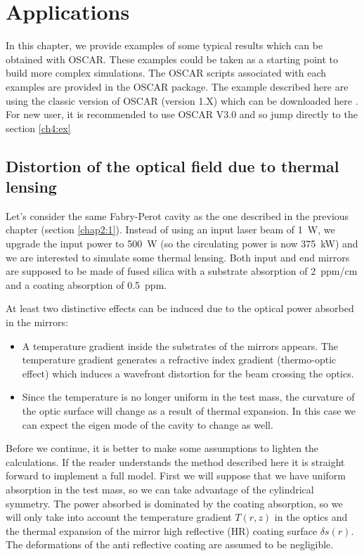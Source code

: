 \chapter{Applications}

In this chapter, we provide examples of some typical results which can be obtained with OSCAR. These examples could be taken as a starting point to build more complex simulations. The OSCAR scripts associated with each examples are provided in the OSCAR package. The example described here are using the classic version of OSCAR (version 1.X) which can be downloaded here \cite{OS_down}. For new user, it is recommended to use OSCAR V3.0 and so jump directly to the section \ref{ch4:ex}

\section{Distortion of the optical field due to thermal lensing}\label{cha3.1}

Let's consider the same Fabry-Perot cavity as the one described in the previous chapter (section \ref{chap2:1}). Instead of using an input laser beam of 1~W, we upgrade the input power to 500~W (so the circulating power is now 375~kW) and we are interested to simulate some thermal lensing. Both input and end mirrors are supposed to be made of fused silica with a substrate absorption of 2~ppm/cm and a coating absorption of 0.5~ppm.

At least two distinctive effects can be induced due to the optical power absorbed in the mirrors:
\begin{itemize}
  \item A temperature gradient inside the substrates of the mirrors appears. The temperature gradient generates a refractive index gradient (thermo-optic effect) which induces a wavefront distortion for the beam crossing the optics.
  \item Since the temperature is no longer uniform in the test mass, the curvature of the optic surface will change as a result of thermal expansion. In this case we can expect the eigen mode of the cavity to change as well.
\end{itemize}

Before we continue, it is better to make some assumptions to lighten the calculations. If the reader understands the method described here it is straight forward to implement a full model. First we will suppose that we have uniform absorption in the test mass, so we can take advantage of the cylindrical symmetry. The power absorbed is dominated by the coating absorption, so we will only take into account the temperature gradient $T(r,z)$ in the optics and the thermal expansion of the mirror high reflective (HR) coating surface $\delta s(r)$. The deformations of the anti reflective coating are assumed to be negligible.

